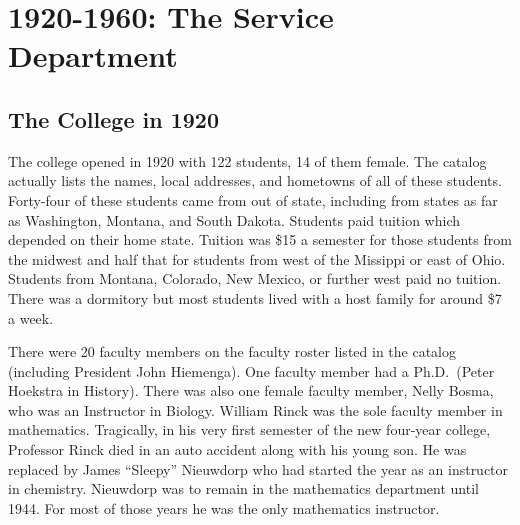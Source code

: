 \documentclass[
]{book}
\begin{document}
\hypertarget{the-service-department}{%
\chapter{1920-1960: The Service Department}\label{the-service-department}}

\hypertarget{the-college-in-1920}{%
\section{The College in 1920}\label{the-college-in-1920}}

The college opened in 1920 with 122 students, 14 of them female. The catalog actually lists the names, local addresses, and hometowns of all of these students. Forty-four of these students came from out of state, including from states as far as Washington, Montana, and South Dakota. Students paid tuition which depended on their home state. Tuition was \$15 a semester for those students from the midwest and half that for students from west of the Missippi or east of Ohio. Students from Montana, Colorado, New Mexico, or further west paid no tuition. There was a dormitory but most students lived with a host family for around \$7 a week.

There were 20 faculty members on the faculty roster listed in the catalog (including President John Hiemenga). One faculty member had a Ph.D.~(Peter Hoekstra in History). There was also one female faculty member, Nelly Bosma, who was an Instructor in Biology. William Rinck was the sole faculty member in mathematics. Tragically, in his very first semester of the new four-year college, Professor Rinck died in an auto accident along with his young son. He was replaced by James ``Sleepy'' Nieuwdorp who had started the year as an instructor in chemistry. Nieuwdorp was to remain in the mathematics department until 1944. For most of those years he was the only mathematics instructor.
\end{document}
